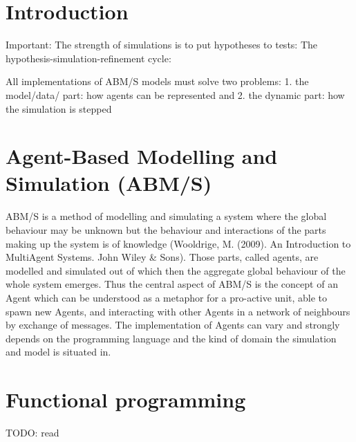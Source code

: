 \section{Introduction}

Important: The strength of simulations is to put hypotheses to tests: The hypothesis-simulation-refinement cycle: 

All implementations of ABM/S models must solve two problems: 1. the model/data/ part: how agents can be represented and 2. the dynamic part: how the simulation is stepped

\section{Agent-Based Modelling and Simulation (ABM/S)}
ABM/S is a method of modelling and simulating a system where the global behaviour may be unknown but the behaviour and interactions of the parts making up the system is of knowledge (Wooldrige, M. (2009). An Introduction to MultiAgent Systems. John Wiley \& Sons). Those parts, called agents, are modelled and simulated out of which then the aggregate global behaviour of the whole system emerges. Thus the central aspect of ABM/S is the concept of an Agent which can be understood as a metaphor for a pro-active unit, able to spawn new Agents, and interacting with other Agents in a network of neighbours by exchange of messages. The implementation of Agents can vary and strongly depends on the programming language and the kind of domain the simulation and model is situated in.

\section{Functional programming}
TODO: read \cite{Backus1978}

